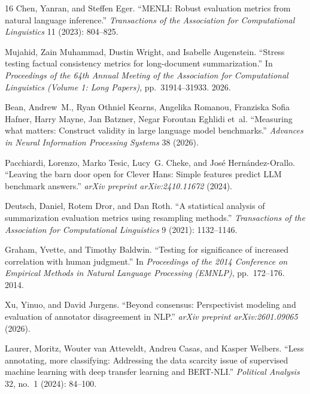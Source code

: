 \begin{thebibliography}{16}
Chen, Yanran, and Steffen Eger. ``MENLI: Robust evaluation metrics from natural
language inference.'' \emph{Transactions of the Association for Computational
Linguistics} 11 (2023): 804--825.

Mujahid, Zain Muhammad, Dustin Wright, and Isabelle Augenstein. ``Stress testing
factual consistency metrics for long-document summarization.'' In
\emph{Proceedings of the 64th Annual Meeting of the Association for Computational
Linguistics (Volume 1: Long Papers)}, pp.~31914--31933. 2026.

Bean, Andrew~M., Ryan Othniel Kearns, Angelika Romanou, Franziska Sofia Hafner,
Harry Mayne, Jan Batzner, Negar Foroutan Eghlidi et~al. ``Measuring what
matters: Construct validity in large language model benchmarks.'' \emph{Advances in
Neural Information Processing Systems} 38 (2026).

Pacchiardi, Lorenzo, Marko Tesic, Lucy~G. Cheke, and Jos{\'e}
Hern{\'a}ndez-Orallo. ``Leaving the barn door open for Clever Hans: Simple
features predict LLM benchmark answers.'' \emph{arXiv preprint arXiv:2410.11672}
(2024).

Deutsch, Daniel, Rotem Dror, and Dan Roth. ``A statistical analysis of
summarization evaluation metrics using resampling methods.''
\emph{Transactions of the Association for Computational Linguistics} 9 (2021):
1132--1146.

Graham, Yvette, and Timothy Baldwin. ``Testing for significance of increased
correlation with human judgment.'' In \emph{Proceedings of the 2014 Conference on
Empirical Methods in Natural Language Processing (EMNLP)}, pp.~172--176. 2014.

Xu, Yinuo, and David Jurgens. ``Beyond consensus: Perspectivist modeling and
evaluation of annotator disagreement in NLP.'' \emph{arXiv preprint
arXiv:2601.09065} (2026).

Laurer, Moritz, Wouter van Atteveldt, Andreu Casas, and Kasper Welbers. ``Less
annotating, more classifying: Addressing the data scarcity issue of supervised
machine learning with deep transfer learning and BERT-NLI.'' \emph{Political
Analysis} 32, no.~1 (2024): 84--100.


\end{thebibliography}
